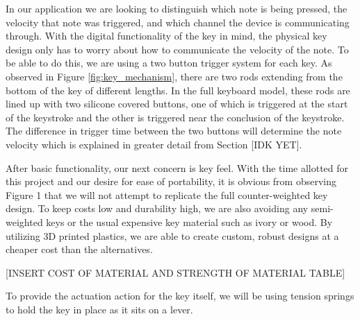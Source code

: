 In our application we are looking to distinguish which note is being pressed, the velocity that note was triggered, and which channel the device is communicating through. With the digital functionality of the key in mind, the physical key design only has to worry about how to communicate the velocity of the note. To be able to do this, we are using a two button trigger system for each key. As observed in Figure \ref{fig:key_mechanism}, there are two rods extending from the bottom of the key of different lengths. In the full keyboard model, these rods are lined up with two silicone covered buttons, one of which is triggered at the start of the keystroke and the other is triggered near the conclusion of the keystroke. The difference in trigger time between the two buttons will determine the note velocity which is explained in greater detail from Section [IDK YET].

After basic functionality, our next concern is key feel. With the time allotted for this project and our desire for ease of portability, it is obvious from observing Figure 1 that we will not attempt to replicate the full counter-weighted key design. To keep costs low and durability high, we are also avoiding any semi-weighted keys or the usual expensive key material such as ivory or wood. By utilizing 3D printed plastics, we are able to create custom, robust designs at a cheaper cost than the alternatives.

  [INSERT COST OF MATERIAL AND STRENGTH OF MATERIAL TABLE]

To provide the actuation action for the key itself, we will be using tension springs to hold the key in place as it sits on a lever.
